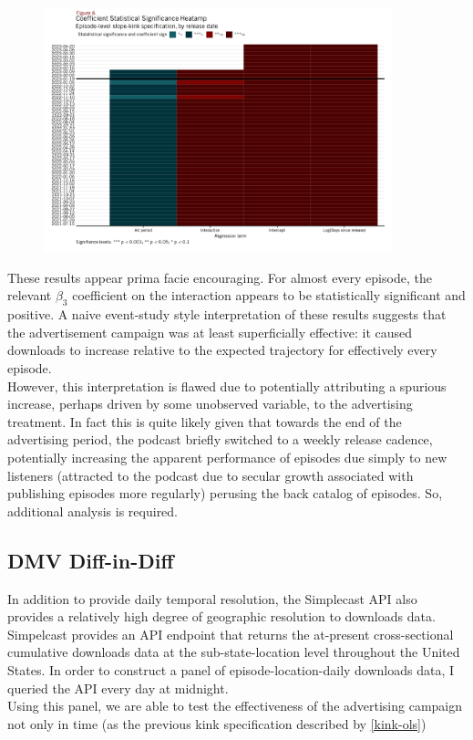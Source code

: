 \documentclass[11pt, letterpaper, twoside]{article}
\begin{document}
\begin{figure}
  \centering
  \includegraphics[width=0.9\textwidth]{figures/daily_kink_sig_heatmap.png}
  \caption{}
  \label{fig:kink-ols-heatmap}
\end{figure}

These results appear prima facie encouraging. For almost every episode, the relevant $\beta_3$ coefficient on the interaction appears to be statistically significant and positive. A naive event-study style interpretation of these results suggests that the advertisement campaign was at least superficially effective: it caused downloads to increase relative to the expected trajectory for effectively every episode.\\

However, this interpretation is flawed due to potentially attributing a spurious increase, perhaps driven by some unobserved variable, to the advertising treatment. In fact this is quite likely given that towards the end of the advertising period, the podcast briefly switched to a weekly release cadence, potentially increasing the apparent performance of episodes due simply to new listeners (attracted to the podcast due to secular growth associated with publishing episodes more regularly) perusing the back catalog of episodes. So, additional analysis is required.

\subsection{DMV Diff-in-Diff}
In addition to provide daily temporal resolution, the Simplecast API also provides a relatively high degree of geographic resolution to downloads data. Simpelcast provides an API endpoint that returns the at-present cross-sectional cumulative downloads data at the sub-state-location level throughout the United States. In order to construct a panel of episode-location-daily downloads data, I queried the API every day at midnight.\\

Using this panel, we are able to test the effectiveness of the advertising campaign not only in time (as the previous kink specification described by \eqref{kink-ols}) 
\end{document}
